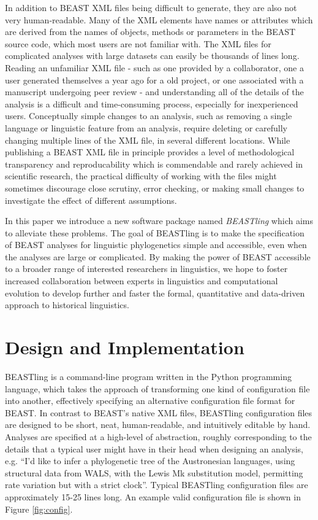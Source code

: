 \documentclass[twocolumn,10pt]{scrartcl}
\begin{document}
In addition to BEAST XML files being difficult to generate, they are also not very human-readable.  Many of the XML elements have names or attributes which are derived from the names of objects, methods or parameters in the BEAST source code, which most users are not familiar with.  The XML files for complicated analyses with large datasets can easily be thousands of lines long.  Reading an unfamiliar XML file - such as one provided by a collaborator, one a user generated themselves a year ago for a old project, or one associated with a manuscript undergoing peer review - and understanding all of the details of the analysis is a difficult and time-consuming process, especially for inexperienced users.  Conceptually simple changes to an analysis, such as removing a single language or linguistic feature from an analysis, require deleting or carefully changing multiple lines of the XML file, in several different locations.  While publishing a BEAST XML file in principle provides a level of methodological transparency and reproducability which is commendable and rarely achieved in scientific research, the practical difficulty of working with the files might sometimes discourage close scrutiny, error checking, or making small changes to investigate the effect of different assumptions.

In this paper we introduce a new software package named \emph{BEASTling} which aims to alleviate these problems.  The goal of BEASTling is to make the specification of BEAST analyses for linguistic phylogenetics simple and accessible, even when the analyses are large or complicated.  By making the power of BEAST accessible to a broader range of interested researchers in linguistics, we hope to foster increased collaboration between experts in linguistics and computational evolution to develop further and faster the formal, quantitative and data-driven approach to historical linguistics.

\section{Design and Implementation}

BEASTling is a command-line program written in the Python programming language, which takes the approach of transforming one kind of configuration file into another, effectively specifying an alternative configuration file format for BEAST.  In contrast to BEAST's native XML files, BEASTling configuration files are designed to be short, neat, human-readable, and intuitively editable by hand.  Analyses are specified at a high-level of abstraction, roughly corresponding to the details that a typical user might have in their head when designing an analysis, e.g. ``I'd like to infer a phylogenetic tree of the Austronesian languages, using structural data from WALS, with the Lewis Mk substitution model, permitting rate variation but with a strict clock''.  Typical BEASTling configuration files are approximately 15-25 lines long.  An example valid configuration file is shown in Figure \ref{fig:config}.
\end{document}
